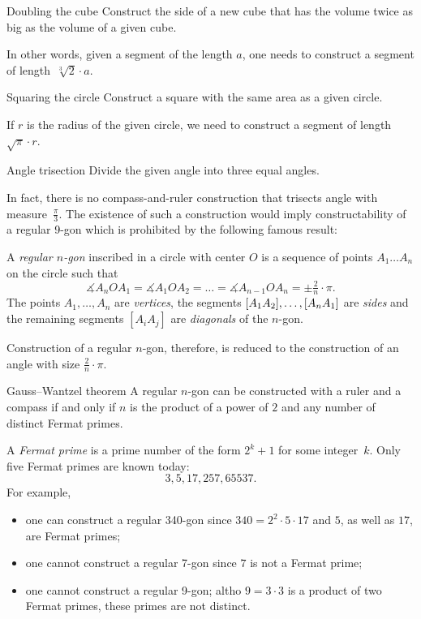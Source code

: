\begin{thm*}{Doubling the cube}
Construct the side of a new cube 
that has the volume twice as big as the volume of a given cube. 
\end{thm*}

In other words, 
given a segment of the length $a$,
one needs to construct a segment of length~$\sqrt[3]{2}\cdot a$.

\begin{thm*}{Squaring the circle}
Construct a square with the same area as a given circle.
\end{thm*}

If $r$ is the radius of the given circle, we need to construct a segment of length~$\sqrt{\pi}\cdot r$. 

\begin{thm*}{Angle trisection} 
Divide the given angle into three equal angles.
\end{thm*}

In fact, there is no compass-and-ruler construction that trisects angle with measure~$\tfrac\pi3$. 
The existence of such a construction would imply constructability of a regular 9-gon which is prohibited by the following famous result:

A \emph{regular $n$-gon} inscribed in a circle with center $O$ is a sequence of points $A_1\dots A_n$ on the circle such that 
\[\measuredangle A_nOA_1=\measuredangle A_1OA_2=\dots=\measuredangle A_{n-1}OA_n=\pm\tfrac2n\cdot \pi.\]
The points $A_1,\dots, A_n$ are \emph{vertices},
the segments $[A_1A_2], \z\dots, [A_nA_1]$ are \emph{sides} 
and the remaining segments $[A_iA_j]$ are \emph{diagonals} of the $n$-gon.

Construction of a regular $n$-gon, therefore, is reduced to the construction of an angle with size $\tfrac2n\cdot \pi$.

\begin{thm}{Gauss--Wantzel theorem}
A regular $n$-gon can be constructed with a ruler and a compass 
if and only if 
$n$ is the product of a power of $2$ and any number of distinct Fermat primes.
\end{thm}

A \emph{Fermat prime} is a prime number of the form $2^k+1$ for some integer~$k$.
Only five Fermat primes are known  today:
$$3, 5, 17, 257, 65537.$$
For example, 
\begin{itemize}
\item one can construct a regular 340-gon since $340=2^2\cdot 5\cdot 17$ and $5$, as well as $17$, are Fermat primes;
\item one cannot construct a regular 7-gon since $7$ is not a Fermat prime;
\item one cannot construct a regular 9-gon; 
altho $9=3\cdot 3$ is a product of two Fermat primes, 
these primes are not distinct.
\end{itemize}

